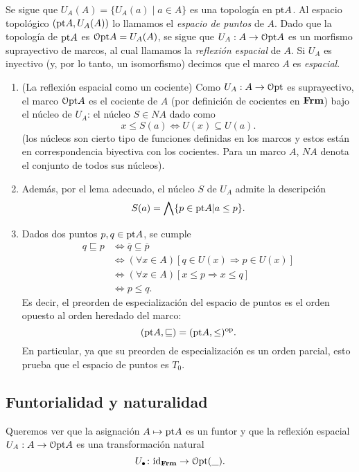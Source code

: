 \documentclass{comunicaciones}
\begin{document}
Se sigue que $U_A(A)=\{U_A(a)\mid a\in A\}$ es una topología en $\mathrm{pt}
A$. Al espacio topológico $(\mathrm{pt} A,U_A(A))$ lo llamamos
el \textit{espacio de puntos} de $A$.
Dado que la topología de $\mathrm{pt} A$ es $\mathcal{O}\mathrm{pt} A=U_A(A)$,
se sigue que $U_A:A\to\mathcal{O}\mathrm{pt} A$ es un morfismo suprayectivo de marcos, al cual llamamos la \textit{reflexión
espacial} de $A$. Si $U_A$ es inyectivo (y, por lo tanto, un
isomorfismo) decimos que el marco $A$ es \textit{espacial}.

\begin{obs}
  \leavevmode
  \begin{enumerate}
    \item (La reflexión espacial como un cociente)
      Como $U_A:A\to\mathcal{O}\mathrm{pt}$ es suprayectivo, el marco $\mathcal{O}\mathrm{pt} A$ 
      es el cociente de $A$ (por definición de cocientes en $\mathbf{Frm}$) bajo el núcleo de $U_A$: el núcleo
      $S\in NA$ dado como
      \[
        x\leq S(a) \iff U(x)\subseteq U(a)
      .\]
(los núcleos son cierto tipo de funciones definidas en los marcos y estos están en correspondencia biyectiva con los cocientes. Para un marco $A$, $NA$ denota el conjunto de todos sus núcleos).
    \item
      Además, por el lema adecuado, el
      núcleo $S$ de $U_A$ admite la descripción
      \[
        S(a)=\bigwedge \{p\in \mathrm{pt} A|a\leq p\}
      .\]
    \item
      Dados dos puntos $p,q\in \mathrm{pt} A$, se cumple
      \begin{align*}
        q\sqsubseteq p&\iff \overline{q}\subseteq \overline{p}\\
        &\iff (\forall x\in A)[q\in U(x)\Rightarrow p\in U(x)]\\
        &\iff (\forall x\in A)[x\leq p\Rightarrow x\leq q]\\
        &\iff p\leq q.
      \end{align*}
      Es decir, el preorden de especialización del espacio de puntos es
      el orden opuesto al orden heredado del marco:
      \[
        (\mathrm{pt} A,\sqsubseteq) = (\mathrm{pt} A,\leq)^{\mathrm{op}}.
      \]
      En particular, ya que su preorden de especialización es un orden
      parcial, esto prueba que el espacio de puntos es $T_0$.
  \end{enumerate}
\end{obs}

\subsection{Funtorialidad y naturalidad}
Queremos ver que la asignación $A\mapsto \mathrm{pt} A$ es un funtor y que
la reflexión espacial $U_A:A\to\mathcal{O}\mathrm{pt} A$
es una transformación natural
\[U_\bullet\colon\mathrm{id}_{\mathbf{Frm}}\to\mathcal{O}\mathrm{pt}(\_).\]
\end{document}
